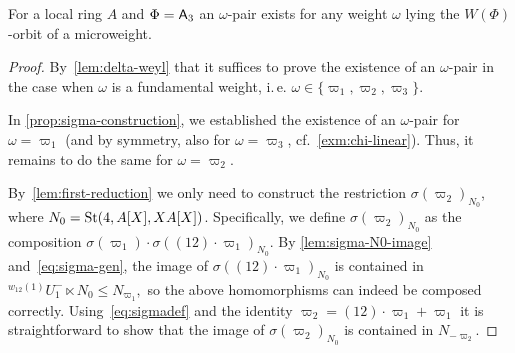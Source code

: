\begin{cor} \label{cor:a3-microweight}
    For a local ring $A$ and $\Phi = \mathsf{A}_3$ an $\omega$-pair exists for any weight $\omega$ lying the $W(\Phi)$-orbit of a microweight.
\end{cor}
\begin{proof}
    By~\cref{lem:delta-weyl} that it suffices to prove the existence of an $\omega$-pair in the case when $\omega$ is a fundamental weight, i.\,e. $\omega \in \{\varpi_1, \varpi_2, \varpi_3\}$.

    In \cref{prop:sigma-construction}, we established the existence of an $\omega$-pair for $\omega = \varpi_1$
    (and by symmetry, also for $\omega = \varpi_3$, cf.~\cref{exm:chi-linear}).
    Thus, it remains to do the same for $\omega = \varpi_{2}$.

    By~\cref{lem:first-reduction} we only need to construct the restriction $\sigma(\varpi_2)_{N_0}$, where $N_0 = \operatorname{St}(4, A[X], XA[X])$.
    Specifically, we define $\sigma(\varpi_2)_{N_0}$ as the composition
    $\sigma(\varpi_1) \cdot \sigma((12) \cdot \varpi_1)_{N_0}$.
    By \cref{lem:sigma-N0-image} and~\eqref{eq:sigma-gen}, the image of $\sigma((12) \cdot \varpi_1)_{N_0}$ is contained in
    ${}^{w_{12}(1)}U_1^- \ltimes N_0 \leq N_{\varpi_1},$ so the above homomorphisms can indeed be composed correctly.
    Using~\eqref{eq:sigmadef} and the identity
    $\varpi_2 = (12) \cdot \varpi_1 + \varpi_1$ it is straightforward to show that the image of $\sigma(\varpi_2)_{N_0}$ is contained in $N_{-\varpi_2}$.
\end{proof}

